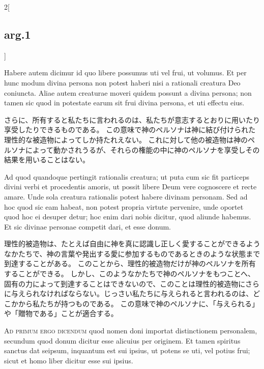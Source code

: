 \documentclass[paper=a4paper,fontsize=10pt,jafontsize=9pt,titlepage]{jlreq}
\begin{document}
\begin{paracol}{2}[\subsection{arg.1}]
\switchcolumn*

Habere autem dicimur id quo
libere possumus uti vel frui, ut volumus. Et per hunc modum divina persona non
potest haberi nisi a rationali creatura Deo coniuncta. Aliae autem creaturae
moveri quidem possunt a divina persona; non tamen sic quod in potestate earum
sit frui divina persona, et uti effectu eius.

\switchcolumn

さらに、所有すると私たちに言われるのは、私たちが意志するとおりに用いたり享受したりできるものである。
この意味で神のペルソナは神に結び付けられた理性的な被造物によってしか持たれえない。
これに対して他の被造物は神のペルソナによって動かされうるが、それらの権能の中に神のペルソナを享受しその結果を用いることはない。

\switchcolumn*

Ad quod quandoque pertingit
rationalis creatura; ut puta cum sic fit particeps divini verbi et procedentis
amoris, ut possit libere Deum vere cognoscere et recte amare. Unde sola
creatura rationalis potest habere divinam personam. Sed ad hoc quod sic eam
habeat, non potest propria virtute pervenire, unde oportet quod hoc ei desuper
detur; hoc enim dari nobis dicitur, quod aliunde habemus. Et sic divinae
personae competit dari, et esse donum.

\switchcolumn

理性的被造物は、たとえば自由に神を真に認識し正しく愛することができるようなかたちで、神の言葉や発出する愛に参加するものであるときのような状態まで到達することがある。
このことから、理性的被造物だけが神のペルソナを所有することができる。
しかし、このようなかたちで神のペルソナをもつことへ、固有の力によって到達することはできないので、このことは理性的被造物にさらに与えられなければならない。じっさい私たちに与えられると言われるのは、どこかから私たちが持つものである。
この意味で神のペルソナに、「与えられる」や「贈物である」ことが適合する。

\switchcolumn*[\subsection{ad.1}]

\textsc{Ad primum ergo dicendum} quod nomen doni importat distinctionem personalem,
secundum quod donum dicitur esse alicuius per originem. Et tamen spiritus
sanctus dat seipsum, inquantum est sui ipsius, ut potens se uti, vel potius
frui; sicut et homo liber dicitur esse sui ipsius.

\switchcolumn


\end{paracol}
\end{document}

